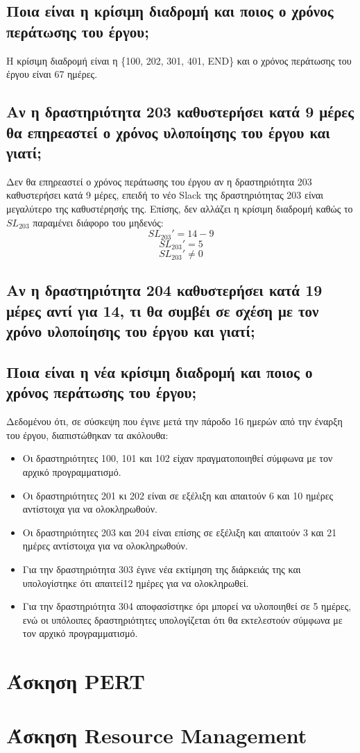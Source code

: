 \documentclass[12pt]{turabian-researchpaper}
\begin{document}
\newpage
\subsection{Ποια είναι η κρίσιμη διαδρομή και ποιος ο χρόνος περάτωσης του έργου;}
\begin{figure}
    \centering
    \def\svgwidth{\columnwidth}
    
\end{figure}
Η κρίσιμη διαδρομή είναι η \{100, 202, 301, 401, END\} και ο χρόνος περάτωσης του έργου είναι 67 ημέρες.

\subsection{Αν η δραστηριότητα 203 καθυστερήσει κατά 9 μέρες θα επηρεαστεί ο χρόνος υλοποίησης του έργου και γιατί;}
Δεν θα επηρεαστεί ο χρόνος περάτωσης του έργου αν η δραστηριότητα 203 καθυστερήσει κατά 9 μέρες, επειδή το νέο Slack της δραστηριότητας 203 είναι μεγαλύτερο της καθυστέρησής της. Επίσης, δεν αλλάζει η κρίσιμη διαδρομή καθώς το $SL_{203}$ παραμένει διάφορο του μηδενός:
$$ SL_{203}' = 14 - 9 $$
$$ SL_{203}' = 5 $$
$$ SL_{203}' \neq 0 $$

\subsection{Αν η δραστηριότητα 204 καθυστερήσει κατά 19 μέρες αντί για 14, τι θα συμβέι σε σχέση με τον χρόνο υλοποίησης του έργου και γιατί;}



\newpage
\subsection{Ποια είναι η νέα κρίσιμη διαδρομή και ποιος ο χρόνος περάτωσης του έργου;}
Δεδομένου ότι, σε σύσκεψη που έγινε μετά την πάροδο 16 ημερών από την έναρξη του έργου, διαπιστώθηκαν τα ακόλουθα:
\begin{itemize}
    \item Οι δραστηριότητες 100, 101 και 102 είχαν πραγματοποιηθεί σύμφωνα με τον αρχικό προγραμματισμό.
    \item Οι δραστηριότητες 201 κι 202 είναι σε εξέλιξη και απαιτούν 6 και 10 ημέρες αντίστοιχα για να ολοκληρωθούν.
    \item Οι δραστηριότητες 203 και 204 είναι επίσης σε εξέλιξη και απαιτούν 3 και 21 ημέρες αντίστοιχα για να ολοκληρωθούν.
    \item Για την δραστηριότητα 303 έγινε νέα εκτίμηση της διάρκειάς της και υπολογίστηκε ότι απαιτεί12 ημέρες για να ολοκληρωθεί.
    \item Για την δραστηριότητα 304 αποφασίστηκε όρι μπορεί να υλοποιηθεί σε 5 ημέρες, ενώ οι υπόλοιπες δραστηριότητες υπολογίζεται ότι θα εκτελεστούν σύμφωνα με τον αρχικό προγραμματισμό.
\end{itemize}


\section{Άσκηση PERT}

\section{Άσκηση Resource Management}
\end{document}
